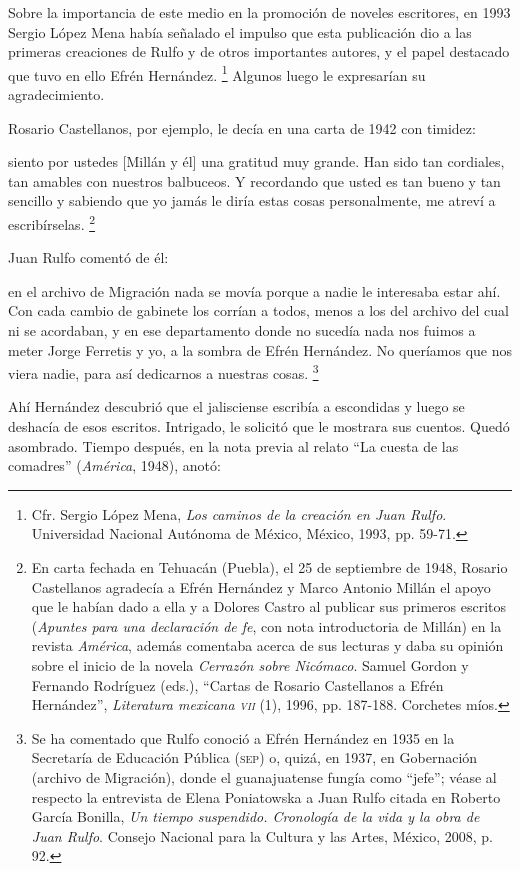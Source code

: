 \documentclass[14pt,twoside,final]{extbook} %
\let\oldfootnote\footnote
\renewcommand\footnote[1]{%
\oldfootnote{\hspace{1mm}#1}}
\begin{document}
Sobre la importancia de este medio en la promoción de noveles escritores, en 1993 Sergio López Mena había señalado el impulso que esta publicación dio a las primeras creaciones de Rulfo y de otros importantes autores, y el papel destacado que tuvo en ello Efrén Hernández.\footnote{Cfr. Sergio López Mena, \emph{Los caminos de la creación en Juan Rulfo}. Universidad Nacional Autónoma de México, México, 1993, pp. 59-71.} Algunos luego le expresarían su agradecimiento.

Rosario Castellanos, por ejemplo, le decía en una carta de 1942 con timidez:
\begin{quoting}
siento por ustedes [Millán y él] una gratitud muy grande. Han sido tan cordiales, tan amables con nuestros balbuceos. Y recordando que usted es tan bueno y tan sencillo y sabiendo que yo jamás le diría estas cosas personalmente, me atreví a escribírselas.\footnote{En carta fechada en Tehuacán (Puebla), el 25 de septiembre de 1948, Rosario Castellanos agradecía a Efrén Hernández y Marco Antonio Millán el apoyo que le habían dado a ella y a Dolores Castro al publicar sus primeros escritos (\emph{Apuntes para una declaración de fe}, con nota introductoria de Millán) en la revista \emph{América}, además comentaba acerca de sus lecturas y daba su opinión sobre el inicio de la novela \emph{Cerrazón sobre Nicómaco}. Samuel Gordon y Fernando Rodríguez (eds.), ``Cartas de Rosario Castellanos a Efrén Hernández'', \emph{Literatura mexicana \textsc{vii}} (1), 1996, pp. 187-188. Corchetes míos.}
\end{quoting}
Juan Rulfo comentó de él: 
\begin{quoting}
en el archivo de Migración nada se movía porque a nadie le interesaba estar ahí. Con cada cambio de gabinete los corrían a todos, menos a los del archivo del cual ni se acordaban, y en ese departamento donde no sucedía nada nos fuimos a meter Jorge Ferretis y yo, a la sombra de Efrén Hernández. No queríamos que nos viera nadie, para así dedicarnos a nuestras cosas.\footnote{Se ha comentado que Rulfo conoció a Efrén Hernández en 1935 en la Secretaría de Educación Pública (\textsc{sep}) o, quizá, en 1937, en Gobernación (archivo de Migración), donde el guanajuatense fungía como ``jefe''; véase al respecto la entrevista de Elena Poniatowska a Juan Rulfo citada en Roberto García Bonilla, \emph{Un tiempo suspendido. Cronología de la vida y la obra de Juan Rulfo}. Consejo Nacional para la Cultura y las Artes, México, 2008, p. 92.}
\end{quoting}
Ahí Hernández descubrió que el jalisciense escribía a escondidas y luego se deshacía de esos escritos. Intrigado, le solicitó que le mostrara sus cuentos. Quedó asombrado. Tiempo después, en la nota previa al relato ``La cuesta de las comadres'' (\emph{América}, 1948), anotó:
\end{document}
